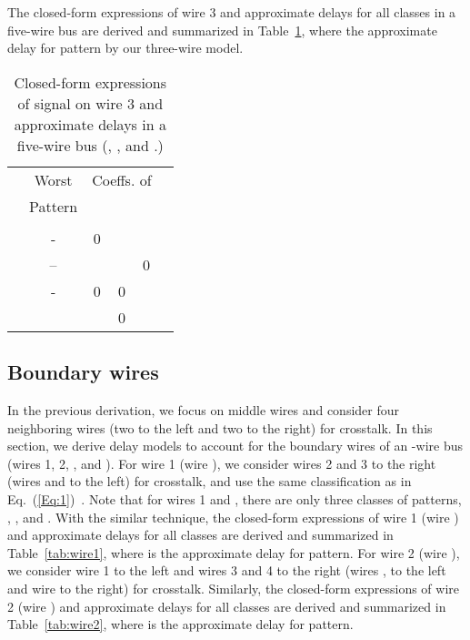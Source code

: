 \documentclass[10pt,journal]{IEEEtran}
\begin{document}
The closed-form expressions of wire 3 and approximate delays for all classes in a five-wire bus are derived and summarized in Table~\ref{tab:5wire}, where  the approximate delay for  pattern by our three-wire model.

\begin{table}[!t]
\caption{Closed-form expressions of signal on wire 3 and approximate delays in a five-wire bus (, , and .)}\label{tab:5wire}
\begin{center}
\begin{tabular}{|c|c|c|c|c|c|}
\hline
\multirow{2}{*}{} & Worst & \multicolumn{3}{|c|}{Coeffs. of } & \multirow{2}{*}{}\\
\cline{3-5}
& Pattern &  &  &  & \\
\hline
 &  &  &  &  &  \\
\hline
 & - & 0 &  &  & \\
\hline
 & -- &  &  & 0 &  \\
\hline
 & - & 0 & 0 &  &  \\
\hline
 &  &  & 0 &  &  \\
\hline
\end{tabular}
\end{center}
\end{table}


\subsection{Boundary wires}
\label{sec:boundary}
In the previous derivation, we focus on middle wires and consider four neighboring wires (two to the left and two to the right) for crosstalk. In this section, we derive delay models to account for the boundary wires of an -wire bus (wires 1, 2, , and ). For wire 1 (wire ), we consider wires 2 and 3 to the right (wires  and  to the left) for crosstalk, and use the same classification as in Eq.~(\ref{Eq:1})~\cite{Sot01}. Note that for wires 1 and , there are only three classes of patterns, , , and .
With the similar technique, the closed-form expressions of wire 1 (wire ) and approximate delays for all classes are derived and summarized in Table~\ref{tab:wire1}, where  is the approximate delay for  pattern.
For wire 2 (wire ), we consider wire 1 to the left and wires 3 and 4 to the right (wires ,  to the left and wire  to the right) for crosstalk. Similarly, the closed-form expressions of wire 2 (wire ) and approximate delays for all classes are derived and summarized in Table~\ref{tab:wire2}, where  is the approximate delay for  pattern.
\end{document}
